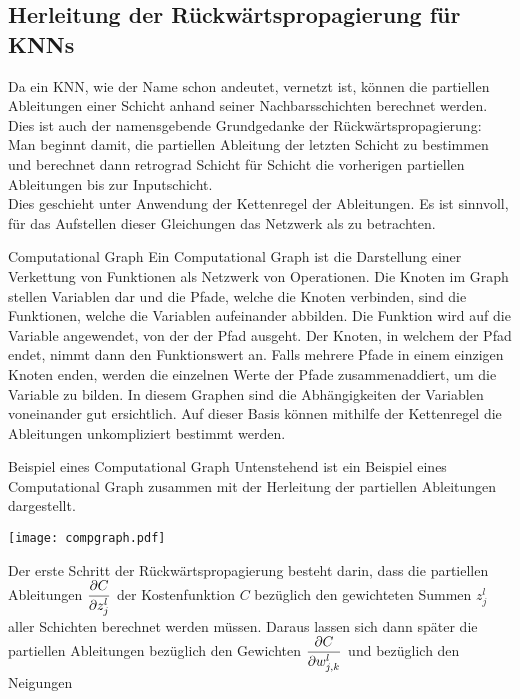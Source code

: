 \begin{appendices}
\chapter{Herleitung der Rückwärtspropagierung für KNNs}\label{sec:anhang_bp}
Da ein KNN, wie der Name schon andeutet, vernetzt ist, können die partiellen
Ableitungen einer Schicht anhand seiner Nachbarsschichten berechnet werden.
Dies ist auch der namensgebende Grundgedanke der Rückwärtspropagierung: Man
beginnt damit, die partiellen Ableitung der letzten Schicht zu bestimmen und
berechnet dann retrograd Schicht für Schicht die vorherigen
partiellen Ableitungen bis zur Inputschicht. \\
Dies geschieht unter Anwendung der Kettenregel der Ableitungen.
Es ist sinnvoll, für das Aufstellen dieser Gleichungen das Netzwerk als
 zu betrachten.
\para{}
\begin{infobox}{Computational Graph}
  Ein Computational Graph ist die Darstellung einer Verkettung von Funktionen als Netzwerk von Operationen.
  Die Knoten im Graph stellen Variablen dar und die Pfade, welche die Knoten
  verbinden, sind die Funktionen, welche die Variablen aufeinander abbilden. Die
  Funktion wird auf die Variable angewendet, von der der Pfad ausgeht. Der Knoten,
  in welchem der Pfad endet, nimmt dann den Funktionswert an. Falls
  mehrere Pfade in einem einzigen Knoten enden, werden die einzelnen Werte der Pfade
  zusammenaddiert, um die Variable zu bilden. In diesem Graphen sind die
  Abhängigkeiten der Variablen voneinander gut ersichtlich. Auf dieser Basis können mithilfe
  der Kettenregel die Ableitungen unkompliziert bestimmt werden.
\end{infobox}
\para{}
\begin{examplebox}{Beispiel eines Computational Graph}
  Untenstehend ist ein Beispiel eines Computational
  Graph zusammen mit der Herleitung der partiellen Ableitungen dargestellt.
  \para{}
  \begin{center}
    \texttt{[image: compgraph.pdf]}
  \end{center}
\end{examplebox}
\para{}
\pagebreak
Der erste Schritt der Rückwärtspropagierung besteht darin, dass die partiellen Ableitungen $\displaystyle\frac{\partial C}{\partial z_j^l}$
der Kostenfunktion $C$ bezüglich den gewichteten Summen $z_j^l$ aller Schichten
berechnet werden müssen. Daraus lassen sich dann später die partiellen Ableitungen
bezüglich den Gewichten $\displaystyle\frac{\partial C}{\partial w_{j,k}^l}$ und bezüglich den Neigungen

\end{appendices}
